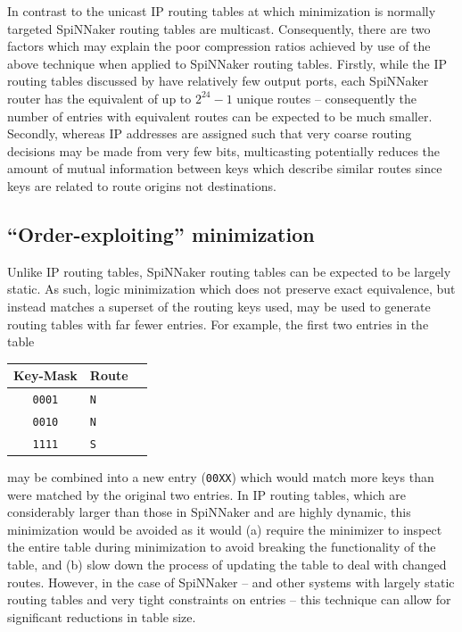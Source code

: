 \documentclass[conference]{IEEEtran}
\newcommand{\mytt}[1]{\texttt{\footnotesize#1}}
\begin{document}
In contrast to the unicast IP routing tables at which minimization is normally targeted SpiNNaker routing tables are multicast.
Consequently, there are two factors which may explain the poor compression ratios achieved by use of the above technique when applied to SpiNNaker routing tables.
Firstly, while the IP routing tables discussed by \textcite{Liu2002} have relatively few output ports, each SpiNNaker router has the equivalent of up to $2^{24} - 1$ unique routes -- consequently the number of entries with equivalent routes can be expected to be much smaller.
Secondly, whereas IP addresses are assigned such that very coarse routing decisions may be made from very few bits, multicasting potentially reduces the amount of mutual information between keys which describe similar routes since keys are related to route origins not destinations.

\subsection*{``Order-exploiting'' minimization}

Unlike IP routing tables, SpiNNaker routing tables can be expected to be largely static.
As such, logic minimization which does not preserve exact equivalence, but instead matches a superset of the routing keys used, may be used to generate routing tables with far fewer entries.
For example, the first two entries in the table

  \begin{table}[H]
    \centering
    \begin{tabular}{c l l}
      \toprule
      Key-Mask & Route \\
      \midrule
      \texttt{0001} & \texttt{N} \\
      \texttt{0010} & \texttt{N} \\
      \texttt{1111} & \texttt{S} \\
      \bottomrule
    \end{tabular}
  \end{table}

\noindent may be combined into a new entry (\mytt{00XX}) which would match more keys than were matched by the original two entries.
In IP routing tables, which are considerably larger than those in SpiNNaker and are highly dynamic, this minimization would be avoided as it would (a) require the minimizer to inspect the entire table during minimization to avoid breaking the functionality of the table,
and (b) slow down the process of updating the table to deal with changed routes.
However, in the case of SpiNNaker -- and other systems with largely static routing tables and very tight constraints on entries -- this technique can allow for significant reductions in table size.
\end{document}
